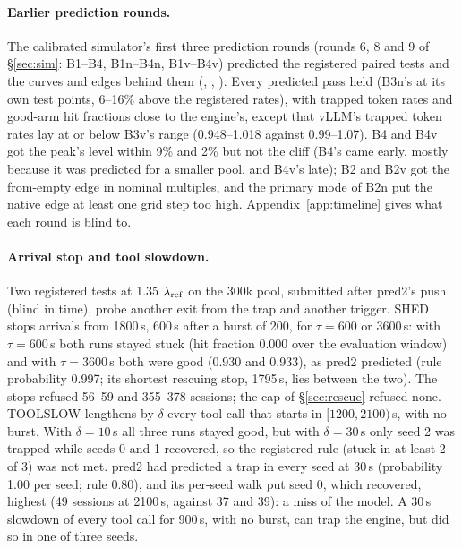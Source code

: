 \paragraph{Earlier prediction rounds.} The calibrated simulator's first three prediction rounds (rounds 6, 8 and 9 of \S\ref{sec:sim}: B1--B4, B1n--B4n, B1v--B4v) predicted the registered paired tests and the curves and edges behind them (, , ). Every predicted pass held (B3n's at its own test points, 6--16\% above the registered rates), with trapped token rates and good-arm hit fractions close to the engine's, except that vLLM's trapped token rates lay at or below B3v's range (0.948--1.018 against 0.99--1.07). B4 and B4v got the peak's level within 9\% and 2\% but not the cliff (B4's came early, mostly because it was predicted for a smaller pool, and B4v's late); B2 and B2v got the from-empty edge in nominal multiples, and the primary mode of B2n put the native edge at least one grid step too high. Appendix~\ref{app:timeline} gives what each round is blind to.

\paragraph{Arrival stop and tool slowdown.} Two registered tests at 1.35 $\lambda_{\mathrm{ref}}$ on the 300k pool, submitted after pred2's push (blind in time), probe another exit from the trap and another trigger. SHED stops arrivals from 1800\,s, 600\,s after a burst of 200, for $\tau=600$ or 3600\,s: with $\tau=600$\,s both runs stayed stuck (hit fraction 0.000 over the evaluation window) and with $\tau=3600$\,s both were good (0.930 and 0.933), as pred2 predicted (rule probability 0.997; its shortest rescuing stop, 1795\,s, lies between the two). The stops refused 56--59 and 355--378 sessions; the cap of \S\ref{sec:rescue} refused none. TOOLSLOW lengthens by $\delta$ every tool call that starts in $[1200,2100)$\,s, with no burst. With $\delta=10$\,s all three runs stayed good, but with $\delta=30$\,s only seed 2 was trapped while seeds 0 and 1 recovered, so the registered rule (stuck in at least 2 of 3) was not met. pred2 had predicted a trap in every seed at 30\,s (probability 1.00 per seed; rule 0.80), and its per-seed walk put seed 0, which recovered, highest (49 sessions at 2100\,s, against 37 and 39): a miss of the model. A 30\,s slowdown of every tool call for 900\,s, with no burst, can trap the engine, but did so in one of three seeds.

